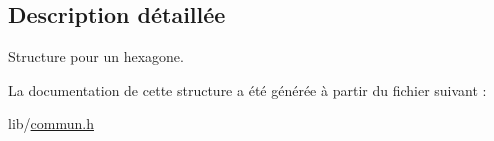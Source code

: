 \subsection{Description détaillée}
Structure pour un hexagone. 

La documentation de cette structure a été générée à partir du fichier suivant \+:\begin{DoxyCompactItemize}
\item 
lib/\hyperlink{commun_8h}{commun.\+h}\end{DoxyCompactItemize}
